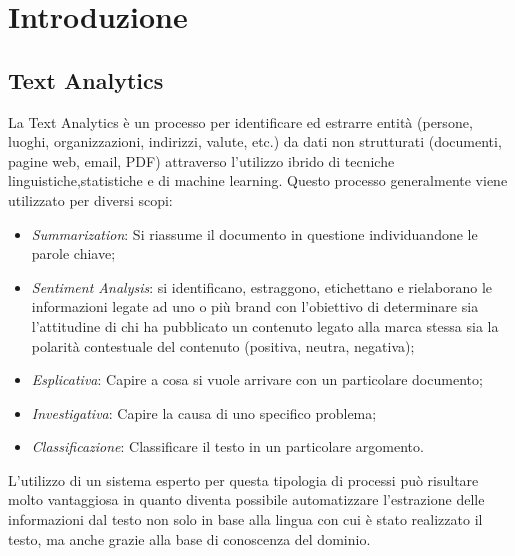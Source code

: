 \section{Introduzione}

\subsection{Text Analytics}
\nocite{wiki:textMining}
\nocite{gartner:textAnalytics}
\nocite{expertsystem:textAnalytics}
La Text Analytics è un processo per identificare ed estrarre entità (persone, luoghi, organizzazioni, indirizzi, valute, etc.) da dati non strutturati (documenti, pagine web, email, PDF) attraverso l'utilizzo ibrido di tecniche linguistiche,statistiche e di machine learning. Questo processo generalmente viene utilizzato per diversi scopi:
\begin{itemize}
	\item \emph{Summarization}: Si riassume il documento in questione individuandone le parole chiave;
	\item \emph{Sentiment Analysis}: si identificano, estraggono, etichettano e rielaborano le informazioni legate ad uno o più brand con l'obiettivo di determinare sia l'attitudine di chi ha pubblicato un contenuto legato alla marca stessa sia la polarità contestuale del contenuto (positiva, neutra, negativa);
	\item \emph{Esplicativa}: Capire a cosa si vuole arrivare con un particolare documento;
	\item \emph{Investigativa}: Capire la causa di uno specifico problema;
	\item \emph{Classificazione}: Classificare il testo in un particolare argomento.
\end{itemize}

L'utilizzo di un sistema esperto per questa tipologia di processi può risultare molto vantaggiosa in quanto diventa possibile automatizzare l'estrazione delle informazioni dal testo non solo in base alla lingua con cui è stato realizzato il testo, ma anche grazie alla base di conoscenza del dominio.




